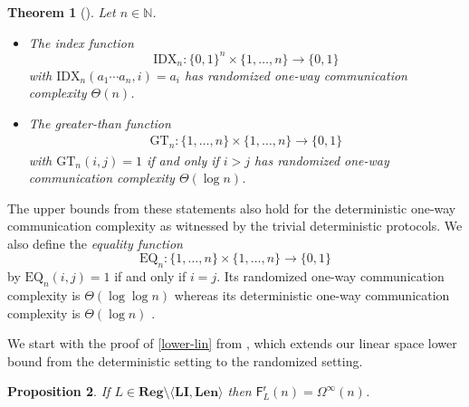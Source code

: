 \documentclass{article}\usepackage[a4paper,margin=20mm]{geometry}
\newtheorem{theorem}{Theorem}\newtheorem{lemma}[theorem]{Lemma}\newtheorem{proposition}[theorem]{Proposition}\newtheorem{corollary}[theorem]{Corollary}\newtheorem{definition}[theorem]{Definition}\newtheorem{claim}[theorem]{Claim}\newtheorem{remark}[theorem]{Remark}\newtheorem{observation}[theorem]{Observation}\newtheorem{conjecture}[theorem]{Conjecture}\newtheorem{example}[theorem]{Example}
\newcommand{\N}{\mathbb{N}}
\newcommand{\F}{\mathsf{F}}
\renewcommand{\r}{\mathsf{r}}
\newcommand{\Reg}{\mathbf{Reg}}
\newcommand{\Len}{\mathbf{Len}}
\newcommand{\LI}{\mathbf{LI}}
\newcommand{\Omegainf}{\Omega^{\scriptscriptstyle{\infty}}}
\begin{document}
\begin{theorem}[{\cite[Theorem~3.7 and 3.8]{KremerNR99}}] \label{thm:coco}
Let $n \in \N$.
\begin{itemize}
\item The {\em index function}
\[ 
	\mathrm{IDX}_n \colon \{0,1\}^n\times \{1,\dots,n\} \to \{0,1\} 
\]
with $\mathrm{IDX}_n(a_1 \cdots a_n,i) = a_i$
has randomized one-way communication complexity $\Theta(n)$.
\item The {\em greater-than function}
\begin{align*}
	\mathrm{GT}_n \colon \{1,\dots,n\}\times \{1,\dots,n\} \to \{0,1\}
\end{align*}
with $\mathrm{GT}_n(i,j) = 1$ if and only if $i > j$
has randomized one-way communication complexity $\Theta(\log n)$.
\end{itemize}
\end{theorem}
The upper bounds from these statements also hold for the deterministic one-way communication complexity
as witnessed by the trivial deterministic protocols.
We also define the {\em equality function} 
\[ 
\mathrm{EQ}_n \colon \{1, \dots, n\} \times \{1,\dots,n\} \to \{0,1\}
\]
by $\mathrm{EQ}_n(i,j) = 1$ if and only if $i = j$.
Its randomized one-way communication complexity is $\Theta(\log \log n)$
whereas its deterministic one-way communication complexity is $\Theta(\log n)$ \cite{KushilevitzN97}.

We start with the proof of \ref{lower-lin} from , which extends our linear
space lower bound from the deterministic setting to the randomized setting.

\begin{proposition}
\label{thm:rand-lin}
If $L \in \Reg \setminus \langle \LI, \Len \rangle$
then $\F^\r_L(n) = \Omegainf(n)$.
\end{proposition}
\end{document}
